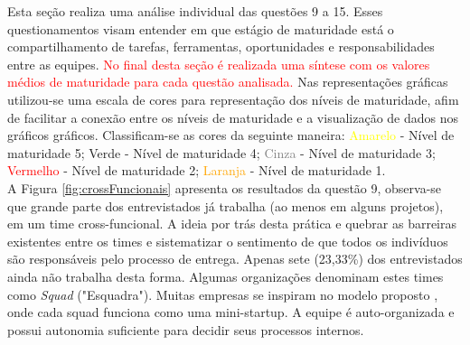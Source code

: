 \documentclass[twoside,english,brazilian]{UNISINOSartigo}
\begin{document}
Esta seção realiza uma análise individual das questões 9 a 15. Esses questionamentos visam entender em que estágio de maturidade está o compartilhamento de tarefas, ferramentas, oportunidades e responsabilidades entre as equipes. \textcolor{red}{No final desta seção é realizada uma síntese com os valores médios de maturidade para cada questão analisada.} Nas representações gráficas utilizou-se uma escala de cores para representação dos níveis de maturidade, afim de facilitar a conexão entre os níveis de maturidade e a visualização de dados nos gráficos gráficos. Classificam-se as cores da seguinte maneira: {\textcolor{yellow}{Amarelo}} - Nível de maturidade 5; \textcolor{persiangreen}{Verde} - Nível de maturidade 4; \textcolor{gray}{Cinza} - Nível de maturidade 3; \textcolor{red}{Vermelho} - Nível de maturidade 2; \textcolor{orange}{Laranja} - Nível de maturidade 1.\\ \indent
 A Figura \ref{fig:crossFuncionais} apresenta os resultados da questão 9, observa-se que grande parte dos entrevistados já trabalha (ao menos em alguns projetos), em um time cross-funcional. A ideia por trás desta prática e quebrar as barreiras existentes entre os times e sistematizar o sentimento de que todos os indivíduos são responsáveis pelo processo de entrega.
Apenas sete (23,33\%) dos entrevistados ainda não trabalha desta forma. 
Algumas organizações denominam estes times como \textit{Squad} ("Esquadra"). Muitas empresas se inspiram no modelo proposto , onde cada squad funciona como uma mini-startup. A equipe é auto-organizada e possui autonomia suficiente para decidir seus processos internos.
\end{document}
